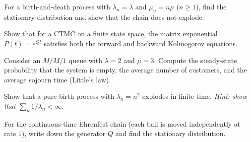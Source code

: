 \begin{exercise}
For a birth-and-death process with $\lambda_n = \lambda$ and $\mu_n = n\mu$
($n \geq 1$), find the stationary distribution and show that the chain does not
explode.
\end{exercise}

\begin{exercise}
Show that for a CTMC on a finite state space, the matrix exponential
$P(t) = e^{Qt}$ satisfies both the forward and backward Kolmogorov equations.
\end{exercise}

\begin{exercise}
Consider an $M/M/1$ queue with $\lambda = 2$ and $\mu = 3$. Compute the
steady-state probability that the system is empty, the average number of
customers, and the average sojourn time (Little's law).
\end{exercise}

\begin{exercise}
Show that a pure birth process with $\lambda_n = n^2$ explodes in finite time.
\emph{Hint: show that $\sum_{n} 1/\lambda_n < \infty$.}
\end{exercise}

\begin{exercise}
For the continuous-time Ehrenfest chain (each ball is moved independently at
rate $1$), write down the generator $Q$ and find the stationary distribution.
\end{exercise}
